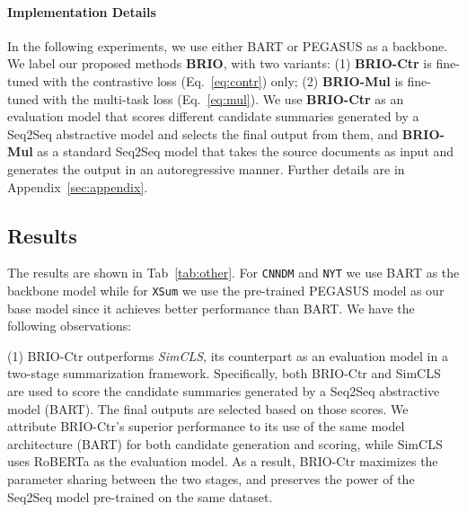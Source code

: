 \documentclass[11pt]{article}
\newcommand{\model}{BRIO\xspace}
\begin{document}
\paragraph{Implementation Details}

In the following experiments, we use either BART or PEGASUS as a backbone.
We label our proposed methods {\textbf{\model}}, with two variants: (1) {\textbf{\model-Ctr}} is fine-tuned with the contrastive loss (Eq.~\ref{eq:contr}) only; (2) {\textbf{\model-Mul}} is fine-tuned with the multi-task loss (Eq.~\ref{eq:mul}).
We use {\textbf{\model-Ctr}} as an evaluation model that scores different candidate summaries generated by a Seq2Seq abstractive model and selects the final output from them, and \textbf{\model-Mul} as a standard Seq2Seq model that takes the source documents as input and generates the output in an autoregressive manner. 
Further details are in Appendix~\ref{sec:appendix}.

\subsection{Results}

The results are shown in Tab~\ref{tab:other}.
For \texttt{CNNDM} and \texttt{NYT} we use BART as the backbone model while for \texttt{XSum} we use the pre-trained PEGASUS model as our base model since it achieves better performance than BART.
We have the following observations:


(1) \model-Ctr outperforms \textit{SimCLS}, its counterpart as an evaluation model in a two-stage summarization framework.
Specifically, both \model-Ctr and SimCLS are used to score the candidate summaries generated by a Seq2Seq abstractive model (BART).
The final outputs are selected based on those scores.
We attribute \model-Ctr's superior performance to its use of the same model architecture (BART) for both candidate generation and scoring, while SimCLS uses RoBERTa as the evaluation model.
As a result, \model-Ctr maximizes the parameter sharing between the two stages, and preserves the power of the Seq2Seq model pre-trained on the same dataset.
\end{document}
